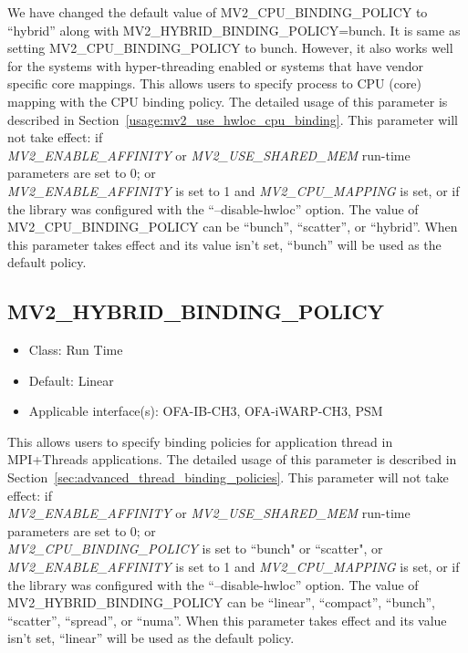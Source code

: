 We have changed the default value of MV2\_CPU\_BINDING\_POLICY to ``hybrid''
along with MV2\_HYBRID\_BINDING\_POLICY=bunch. It is same as setting  
MV2\_CPU\_BINDING\_POLICY to bunch. However, it also works well for 
the systems with hyper-threading enabled or systems that have vendor specific 
core mappings.
This allows users to specify process to CPU (core) mapping with the CPU binding
policy. The detailed usage of this parameter is described in 
Section~\ref{usage:mv2_use_hwloc_cpu_binding}. This parameter will not take 
effect: if \\
\textit {MV2\_ENABLE\_AFFINITY} or \textit{MV2\_USE\_SHARED\_MEM} run-time parameters
are set to 0; or \\
\textit{MV2\_ENABLE\_AFFINITY} is set to 1 and \textit{MV2\_CPU\_MAPPING} is
set, or if the library was configured with the ``--disable-hwloc'' option.
The value of MV2\_CPU\_BINDING\_POLICY can be ``bunch'', ``scatter'', or
``hybrid''.  When this parameter takes effect and its value isn't set, ``bunch''
will be used as the default policy.


\subsection{MV2\_HYBRID\_BINDING\_POLICY}
\label{def:mv2-threads-binding-policy}
\begin{itemize}
    \item Class: Run Time
    \item Default: Linear 
    \item Applicable interface(s):  OFA-IB-CH3, OFA-iWARP-CH3, PSM
\end{itemize}

This allows users to specify binding policies for application thread in
MPI+Threads applications. The detailed usage of this parameter is described in 
Section~\ref{sec:advanced_thread_binding_policies}. This parameter will not take 
effect: if \\
\textit {MV2\_ENABLE\_AFFINITY} or \textit{MV2\_USE\_SHARED\_MEM} run-time parameters
are set to 0; or \\
\textit{MV2\_CPU\_BINDING\_POLICY} is set to ``bunch" or ``scatter", or \\
\textit{MV2\_ENABLE\_AFFINITY} is set to 1 and \textit{MV2\_CPU\_MAPPING} is
set, or if the library was configured with the ``--disable-hwloc'' option.
The value of MV2\_HYBRID\_BINDING\_POLICY can be ``linear'', ``compact'', ``bunch'', 
``scatter'', ``spread'', or ``numa''. 
When this parameter takes effect and its value isn't set, ``linear''
will be used as the default policy.

